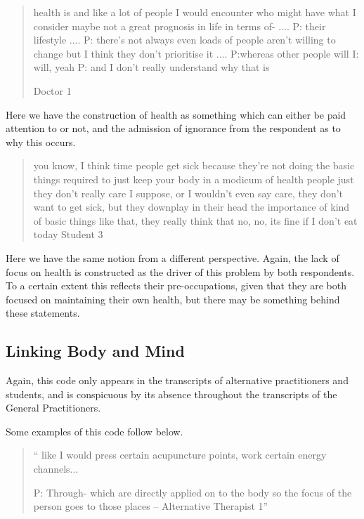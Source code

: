 \begin{quotation}
  health is and like a lot of people I would encounter who might have what I consider maybe not a great prognosis in life in terms of-
....
P: their lifestyle 
....
P: there's not always even loads of people aren't willing to change but I think they don't prioritise it 
....
P:whereas other people will 
I: will, yeah
P: and I don't really understand why that is 

Doctor 1
\end{quotation}
Here we have the construction of health as something which can either be paid attention to or not, and the admission of ignorance from the respondent as to why this occurs. 

\begin{quotation}
  you know, I think time people get sick because they're not doing the basic things required to just keep your body in a modicum of health people just they don't really care I suppose, or I wouldn't even say care, they don't want to get sick, but they downplay in their head the importance of kind of basic things like that, they really think that no, no, its fine if I don't eat today
Student 3
\end{quotation}


Here we have the same notion from a different perspective. Again, the lack of focus on health is constructed as the driver of this problem by both respondents. To a certain extent this reflects their pre-occupations, given that they are both focused on maintaining their own health, but there may be something behind these statements. 

\subsection{Linking Body and Mind}

Again, this code only appears in the transcripts of alternative practitioners and students, and is conspicuous by its absence throughout the transcripts of the General Practitioners. 

Some examples of this code follow below. 

\begin{quotation}
`` like I would press certain acupuncture points, work certain energy channels...

P: Through- which are directly applied on to the body so the focus of the person goes to those places – Alternative Therapist 1''  
\end{quotation}


